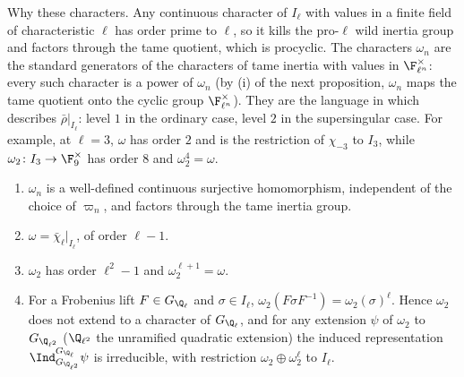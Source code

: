 Why these characters. Any continuous character of $I_\ell$ with values in a finite field of characteristic $\ell$ has order prime to $\ell$, so it kills the
pro-$\ell$ wild inertia group and factors through the tame quotient, which is procyclic. The characters $\omega_n$ are the standard generators of the
characters of tame inertia with values in $\F_{\ell^n}^\times$: every such character is a power of $\omega_n$ (by (i) of the next proposition, $\omega_n$ maps the
tame quotient onto the cyclic group $\F_{\ell^n}^\times$). They are the language in which  describes $\bar\rho|_{I_\ell}$: level $1$ in the
ordinary case, level $2$ in the supersingular case. For example, at $\ell=3$, $\omega$ has order $2$ and is the restriction of $\chi_{-3}$ to $I_3$, while
$\omega_2\colon I_3\to\F_9^\times$ has order $8$ and $\omega_2^4=\omega$.

\begin{proposition}\label{prop:galrep:fundamental-characters}
\begin{enumerate}[label=(\roman*)]
\item $\omega_n$ is a well-defined continuous surjective homomorphism, independent of the choice of $\varpi_n$, and factors through the tame
inertia group.
\item $\omega=\bar\chi_\ell|_{I_\ell}$, of order $\ell-1$.
\item $\omega_2$ has order $\ell^2-1$ and $\omega_2^{\ell+1}=\omega$.
\item For a Frobenius lift $F\in G_{\Q_\ell}$ and $\sigma\in I_\ell$, $\omega_2(F\sigma F^{-1})=\omega_2(\sigma)^\ell$. Hence $\omega_2$ does not extend to a character of $G_{\Q_\ell}$,
and for any extension $\psi$ of $\omega_2$ to $G_{\Q_{\ell^2}}$ ($\Q_{\ell^2}$ the unramified quadratic extension) the induced representation
$\Ind_{G_{\Q_{\ell^2}}}^{G_{\Q_\ell}}\psi$ is irreducible, with restriction $\omega_2\oplus\omega_2^\ell$ to $I_\ell$.
\end{enumerate}
\end{proposition}

